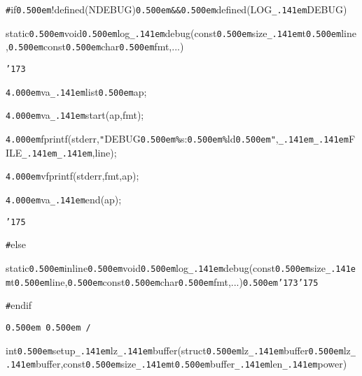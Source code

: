 \noindent
{}\hfill

\noindent
{}\hfill

\noindent
{}{\tt\#}if{\tt\mc \kern0.500em}!defined(NDEBUG){\tt\mc \kern0.500em}{\tt\&}{\tt\&}{\tt\mc \kern0.500em}defined(LOG{\tt\_\kern.141em}DEBUG)

\noindent
{}static{\tt\mc \kern0.500em}void{\tt\mc \kern0.500em}log{\tt\_\kern.141em}debug(const{\tt\mc \kern0.500em}size{\tt\_\kern.141em}t{\tt\mc \kern0.500em}line,{\tt\mc \kern0.500em}const{\tt\mc \kern0.500em}char{\tt *}{\tt\mc \kern0.500em}fmt,...)

\noindent
{}{\tt\char'173}

\noindent
{}{\tt\mc \kern4.000em}va{\tt\_\kern.141em}list{\tt\mc \kern0.500em}ap;

\noindent
{}{\tt\mc \kern4.000em}va{\tt\_\kern.141em}start(ap,fmt);

\noindent
{}{\tt\mc \kern4.000em}fprintf(stderr,{\tt "}DEBUG{\tt\mc \kern0.500em}{\tt\%}s:{\tt\mc \kern0.500em}{\tt\%}ld{\tt\mc \kern0.500em}{\tt "},{\tt\_\kern.141em}{\tt\_\kern.141em}FILE{\tt\_\kern.141em}{\tt\_\kern.141em},line);

\noindent
{}{\tt\mc \kern4.000em}vfprintf(stderr,fmt,ap);

\noindent
{}{\tt\mc \kern4.000em}va{\tt\_\kern.141em}end(ap);

\noindent
{}{\tt\char'175}

\noindent
{}\hfill

\noindent
{}{\tt\#}else

\noindent
{}static{\tt\mc \kern0.500em}inline{\tt\mc \kern0.500em}void{\tt\mc \kern0.500em}log{\tt\_\kern.141em}debug(const{\tt\mc \kern0.500em}size{\tt\_\kern.141em}t{\tt\mc \kern0.500em}line,{\tt\mc \kern0.500em}const{\tt\mc \kern0.500em}char{\tt *}{\tt\mc \kern0.500em}fmt,...){\tt\mc \kern0.500em}{\tt\char'173}{\tt\char'175}

\noindent
{}{\tt\#}endif

\noindent
{}\hfill

\noindent
{}\tt\mc {\tt /}{\tt *}\kern0.500em {\tt *}{\tt *}{\tt *}{\tt *}{\tt *}{\tt *}{\tt *}{\tt *}{\tt *}{\tt *}{\tt *}{\tt *}\kern0.500em {\tt *}{\tt /}
\tt\mc 

\noindent
{}int{\tt\mc \kern0.500em}setup{\tt\_\kern.141em}lz{\tt\_\kern.141em}buffer(struct{\tt\mc \kern0.500em}lz{\tt\_\kern.141em}buffer{\tt *}{\tt\mc \kern0.500em}lz{\tt\_\kern.141em}buffer,const{\tt\mc \kern0.500em}size{\tt\_\kern.141em}t{\tt\mc \kern0.500em}buffer{\tt\_\kern.141em}len{\tt\_\kern.141em}power)

